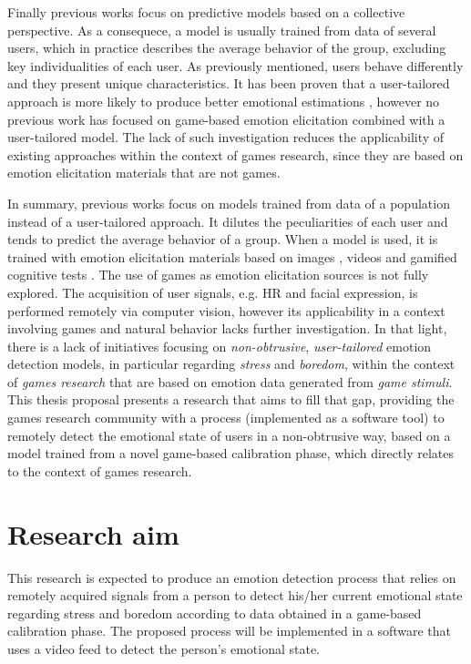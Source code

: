Finally previous works focus on predictive models based on a collective perspective. As a consequece, a model is usually trained from data of several users, which in practice describes the average behavior of the group, excluding key individualities of each user. As previously mentioned, users behave differently and they present unique characteristics. It has been proven that a user-tailored approach is more likely to produce better emotional estimations \parencite{bailenson2008real}, however no previous work has focused on game-based emotion elicitation combined with a user-tailored model. The lack of such investigation reduces the applicability of existing approaches within the context of games research, since they are based on emotion elicitation materials that are not games.

In summary, previous works focus on models trained from data of a population instead of a user-tailored approach. It dilutes the peculiarities of each user and tends to predict the average behavior of a group. When a model is used, it is trained with emotion elicitation materials based on images \parencite{giannakakis2017stress,anttonen2005emotions}, videos \parencite{bailenson2008real,grundlehner2009design} and gamified cognitive tests \parencite{mcduff2014remote,mcduffcogcam}. The use of games as emotion elicitation sources is not fully explored. The acquisition of user signals, e.g. HR and facial expression, is performed remotely via computer vision, however its applicability in a context involving games and natural behavior lacks further investigation. In that light, there is a lack of initiatives focusing on \textit{non-obtrusive}, \textit{user-tailored} emotion detection models, in particular regarding \textit{stress} and \textit{boredom}, within the context of \textit{games research} that are based on emotion data generated from \textit{game stimuli}. This thesis proposal presents a research that aims to fill that gap, providing the games research community with a process (implemented as a software tool) to remotely detect the emotional state of users in a non-obtrusive way, based on a model trained from a novel game-based calibration phase, which directly relates to the context of games research.

\section{Research aim}
\label{sec:research-aim}

This research is expected to produce an emotion detection process that relies on remotely acquired signals from a person to detect his/her current emotional state regarding stress and boredom according to data obtained in a game-based calibration phase. The proposed process will be implemented in a software that uses a video feed to detect the person's emotional state.


